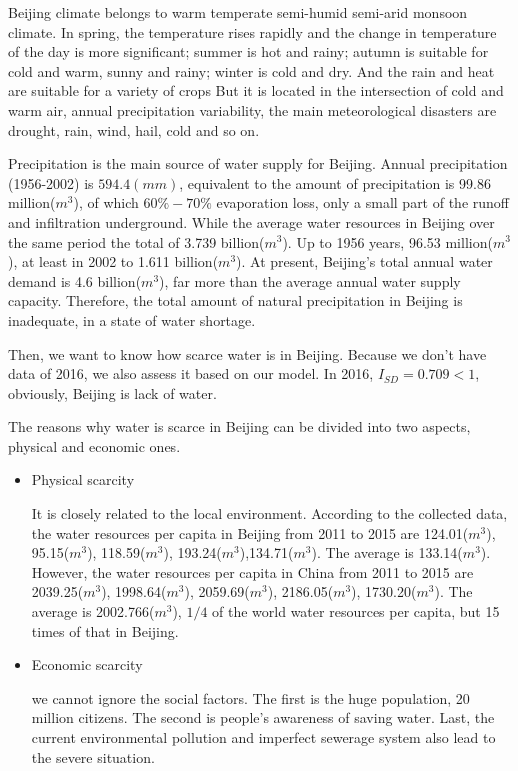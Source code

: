\documentclass{mcmthesis}
\begin{document}
\par Beijing climate belongs to warm temperate semi-humid semi-arid monsoon climate. In spring, the temperature rises rapidly and the change in temperature of the day is more significant; summer is hot and rainy; autumn is suitable for cold and warm, sunny and rainy; winter is cold and dry. And the rain and heat are suitable for a variety of crops But it is located in the intersection of cold and warm air, annual precipitation variability, the main meteorological disasters are drought, rain, wind, hail, cold and so on.
\par Precipitation is the main source of water supply for Beijing. Annual precipitation (1956-2002) is $594.4 (mm)$, equivalent to the amount of precipitation is 99.86 million($m^3$), of which $60\% -70\%$ evaporation loss, only a small part of the runoff and infiltration underground. While the average water resources in Beijing over the same period the total of 3.739 billion($m^3$). Up to 1956 years, 96.53 million($m^3$), at least in 2002 to 1.611 billion($m^3$). At present, Beijing's total annual water demand is 4.6 billion($m^3$), far more than the average annual water supply capacity. Therefore, the total amount of natural precipitation in Beijing is inadequate, in a state of water shortage.
\par Then, we want to know how scarce water is in Beijing. Because we don’t have data of 2016, we also assess it based on our model. In 2016, $I_{SD} = 0.709 < 1$, obviously, Beijing is lack of water.
\par The reasons why water is scarce in Beijing can be divided into two aspects, physical and economic ones. 

\begin{itemize}
	\item Physical scarcity
	
	\par It is closely related to the local environment. According to the collected data, the water resources per capita in Beijing from 2011 to 2015 are 124.01($m^3$), 95.15($m^3$), 118.59($m^3$), 193.24($m^3$),134.71($m^3$). The average is 133.14($m^3$). However, the water resources per capita in China from 2011 to 2015 are 2039.25($m^3$), 1998.64($m^3$), 2059.69($m^3$), 2186.05($m^3$), 1730.20($m^3$). The average is 2002.766($m^3$), $1/4$ of the world water resources per capita, but 15 times of that in Beijing.
	\item Economic scarcity
	
	\par we cannot ignore the social factors. The first is the huge population, 20 million citizens. The second is people’s awareness of saving water. Last, the current environmental pollution and imperfect sewerage system also lead to the severe situation.
\end{itemize}
\end{document}
